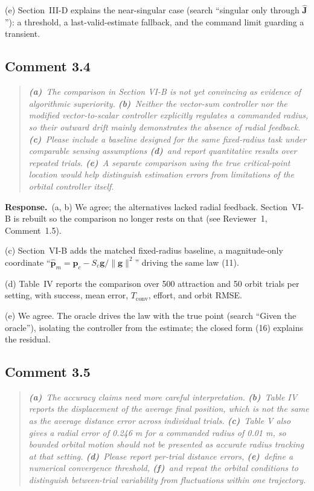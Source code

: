 \documentclass[10pt]{article}
\newcommand{\rev}[1]{#1}                             %
\newcommand{\resp}{\par\textbf{Response.}~}
\begin{document}
(e) Section~III-D explains the near-singular case (search ``singular only through $\hat{\mathbf{J}}$''): a threshold, a last-valid-estimate fallback, and the command limit guarding a transient.

\subsection*{Comment 3.4}

\begin{quote}\itshape
\textbf{(a)}~The comparison in Section VI-B is not yet convincing as evidence of algorithmic superiority.
\textbf{(b)}~Neither the vector-sum controller nor the modified vector-to-scalar controller explicitly regulates a commanded radius, so their outward drift mainly demonstrates the absence of radial feedback.
\textbf{(c)}~Please include a baseline designed for the same fixed-radius task under comparable sensing assumptions
\textbf{(d)}~and report quantitative results over repeated trials.
\textbf{(e)}~A separate comparison using the true critical-point location would help distinguish estimation errors from limitations of the orbital controller itself.
\end{quote}

\resp (a, b) We agree; the alternatives lacked radial feedback. Section~VI-B is rebuilt so the comparison no longer rests on that (see Reviewer~1, Comment~1.5).

(c) Section~VI-B adds the matched fixed-radius baseline, a magnitude-only coordinate ``$\hat{\mathbf{p}}_m = \mathbf{p}_c - S_c\mathbf{g}/\|\mathbf{g}\|^2$'' driving the same law (11).

(d) Table~IV reports the comparison over \rev{500} attraction and \rev{50} orbit trials per setting, with success, mean error, $T_{\mathrm{conv}}$, effort, and orbit RMSE.

(e) We agree. The oracle drives the law with the true point (search ``Given the oracle''), isolating the controller from the estimate; the closed form (16) explains the residual.

\subsection*{Comment 3.5}

\begin{quote}\itshape
\textbf{(a)}~The accuracy claims need more careful interpretation.
\textbf{(b)}~Table IV reports the displacement of the average final position, which is not the same as the average distance error across individual trials.
\textbf{(c)}~Table V also gives a radial error of 0.246 m for a commanded radius of 0.01 m, so bounded orbital motion should not be presented as accurate radius tracking at that setting.
\textbf{(d)}~Please report per-trial distance errors,
\textbf{(e)}~define a numerical convergence threshold,
\textbf{(f)}~and repeat the orbital conditions to distinguish between-trial variability from fluctuations within one trajectory.
\end{quote}
\end{document}
